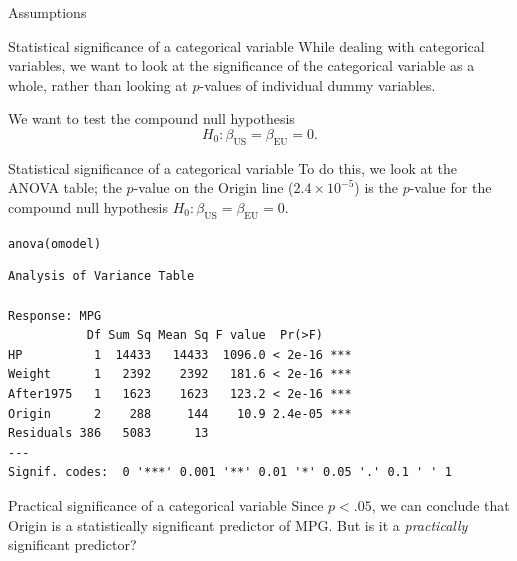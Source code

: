 \documentclass{beamer}\usepackage[]{graphicx}\usepackage[]{color}
\makeatletter
\newcommand{\hlstd}[1]{\textcolor[rgb]{1,0.894,0.769}{#1}}%
\newcommand{\hlkwd}[1]{\textcolor[rgb]{1,0.78,0.769}{#1}}%
\newenvironment{kframe}{%
 \def\at@end@of@kframe{}%
 \ifinner\ifhmode%
  \def\at@end@of@kframe{\end{minipage}}%
  \begin{minipage}{\columnwidth}%
 \fi\fi%
 \def\FrameCommand##1{\hskip\@totalleftmargin \hskip-\fboxsep
 \colorbox{shadecolor}{##1}\hskip-\fboxsep
     \hskip-\linewidth \hskip-\@totalleftmargin \hskip\columnwidth}%
 \MakeFramed {\advance\hsize-\width
   \@totalleftmargin\z@ \linewidth\hsize
   \@setminipage}}%
 {\par\unskip\endMakeFramed%
 \at@end@of@kframe}
\newenvironment{knitrout}{}{} %
\makeatother
\begin{document}
\begin{darkframes}
\begin{frame}[fragile]{Assumptions}
\begin{knitrout}
\end{knitrout}
      
      \end{frame}

      \begin{frame}[fragile]{Statistical significance of a categorical variable}
        While dealing with categorical variables, we want to look at the significance of the categorical variable as a whole, rather than looking at $p$-values of individual dummy variables.

        \bigskip\pause

        We want to test the \alert{compound null hypothesis} 
        \[
          H_0 : \beta_{\text{US}} = \beta_{\text{EU}} = 0.
        \]
      \end{frame}
      
      \begin{frame}[fragile]{Statistical significance of a categorical variable}
        To do this, we look at the ANOVA table; the $p$-value on the Origin line ($2.4 \times 10^{-5}$) is the $p$-value for the compound null hypothesis $H_0 : \beta_{\text{US}} = \beta_{\text{EU}} = 0$.
        \fontsize{9}{9}\selectfont
\begin{knitrout}
\begin{kframe}
\begin{alltt}
\hlkwd{anova}\hlstd{(omodel)}
\end{alltt}
\begin{verbatim}
Analysis of Variance Table

Response: MPG
           Df Sum Sq Mean Sq F value  Pr(>F)    
HP          1  14433   14433  1096.0 < 2e-16 ***
Weight      1   2392    2392   181.6 < 2e-16 ***
After1975   1   1623    1623   123.2 < 2e-16 ***
Origin      2    288     144    10.9 2.4e-05 ***
Residuals 386   5083      13                    
---
Signif. codes:  0 '***' 0.001 '**' 0.01 '*' 0.05 '.' 0.1 ' ' 1
\end{verbatim}
\end{kframe}
\end{knitrout}
      \end{frame}
      
      \begin{frame}{Practical significance of a categorical variable}
        Since $p<.05$, we can conclude that Origin is a statistically significant predictor of MPG.
        But is it a \emph{practically} significant predictor?
        

\end{frame}
\end{darkframes}
\end{document}
